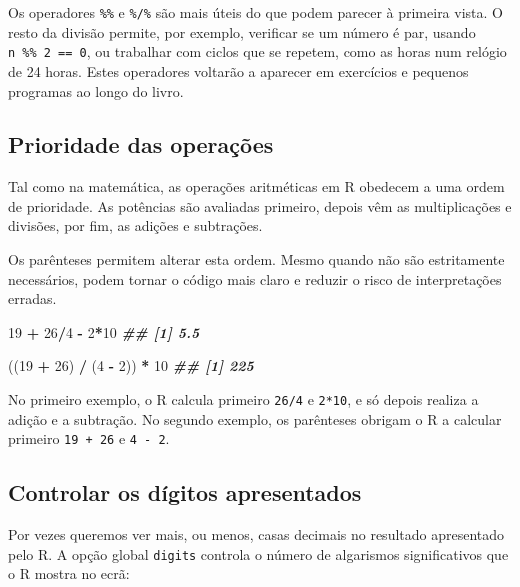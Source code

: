 \documentclass[
  portuguese,
  11pt,
  openany]{book}
\newenvironment{Shaded}{\begin{snugshade}}{\end{snugshade}}
\newcommand{\DecValTok}[1]{\textcolor[rgb]{0.00,0.00,0.81}{#1}}
\newcommand{\DocumentationTok}[1]{\textcolor[rgb]{0.56,0.35,0.01}{\textbf{\textit{#1}}}}
\newcommand{\NormalTok}[1]{#1}
\newcommand{\SpecialCharTok}[1]{\textcolor[rgb]{0.81,0.36,0.00}{\textbf{#1}}}
\begin{document}
Os operadores \texttt{\%\%} e \texttt{\%/\%} são mais úteis do que podem parecer à primeira vista. O resto da divisão permite, por exemplo, verificar se um número é par, usando \texttt{n\ \%\%\ 2\ ==\ 0}, ou trabalhar com ciclos que se repetem, como as horas num relógio de 24 horas. Estes operadores voltarão a aparecer em exercícios e pequenos programas ao longo do livro.

\subsection{Prioridade das operações}\label{prioridade-das-operauxe7uxf5es}

Tal como na matemática, as operações aritméticas em R obedecem a uma ordem de prioridade. As potências são avaliadas primeiro, depois vêm as multiplicações e divisões, por fim, as adições e subtrações.

Os parênteses permitem alterar esta ordem. Mesmo quando não são estritamente necessários, podem tornar o código mais claro e reduzir o risco de interpretações erradas.

\begin{Shaded}
\begin{Highlighting}[]
\DecValTok{19} \SpecialCharTok{+} \DecValTok{26}\SpecialCharTok{/}\DecValTok{4} \SpecialCharTok{{-}} \DecValTok{2}\SpecialCharTok{*}\DecValTok{10}
\DocumentationTok{\#\# [1] 5.5}

\NormalTok{((}\DecValTok{19} \SpecialCharTok{+} \DecValTok{26}\NormalTok{) }\SpecialCharTok{/}\NormalTok{ (}\DecValTok{4} \SpecialCharTok{{-}} \DecValTok{2}\NormalTok{)) }\SpecialCharTok{*} \DecValTok{10}
\DocumentationTok{\#\# [1] 225}
\end{Highlighting}
\end{Shaded}

No primeiro exemplo, o R calcula primeiro \texttt{26/4} e \texttt{2*10}, e só depois realiza a adição e a subtração. No segundo exemplo, os parênteses obrigam o R a calcular primeiro \texttt{19\ +\ 26} e \texttt{4\ -\ 2}.

\subsection{Controlar os dígitos apresentados}\label{controlar-os-duxedgitos-apresentados}

Por vezes queremos ver mais, ou menos, casas decimais no resultado apresentado pelo R. A opção global \texttt{digits} controla o número de algarismos significativos que o R mostra no ecrã:
\end{document}
